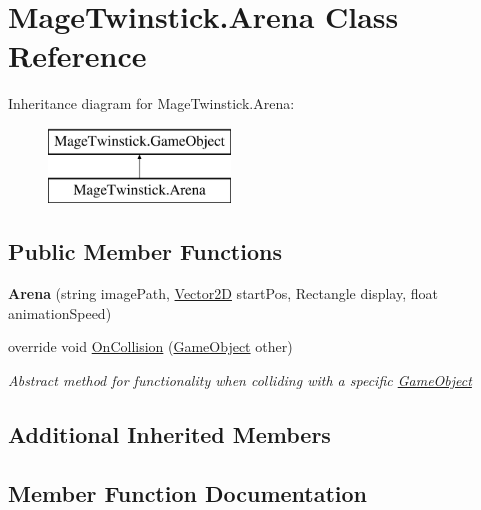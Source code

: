 \hypertarget{class_mage_twinstick_1_1_arena}{}\section{Mage\+Twinstick.\+Arena Class Reference}
\label{class_mage_twinstick_1_1_arena}
Inheritance diagram for Mage\+Twinstick.\+Arena\+:\begin{figure}[H]
\begin{center}
\leavevmode
\includegraphics[height=2.000000cm]{class_mage_twinstick_1_1_arena}
\end{center}
\end{figure}
\subsection*{Public Member Functions}
\begin{DoxyCompactItemize}
\item 
\hypertarget{class_mage_twinstick_1_1_arena_aace14406dc02031e9739a08e5be7301b}{}{\bfseries Arena} (string image\+Path, \hyperlink{class_mage_twinstick_1_1_vector2_d}{Vector2\+D} start\+Pos, Rectangle display, float animation\+Speed)\label{class_mage_twinstick_1_1_arena_aace14406dc02031e9739a08e5be7301b}

\item 
override void \hyperlink{class_mage_twinstick_1_1_arena_a12cdc5acc58ee006eb0b5a47507934fc}{On\+Collision} (\hyperlink{class_mage_twinstick_1_1_game_object}{Game\+Object} other)
\begin{DoxyCompactList}\small\item\em Abstract method for functionality when colliding with a specific \hyperlink{class_mage_twinstick_1_1_game_object}{Game\+Object} \end{DoxyCompactList}\end{DoxyCompactItemize}
\subsection*{Additional Inherited Members}


\subsection{Member Function Documentation}
\hypertarget{class_mage_twinstick_1_1_arena_a12cdc5acc58ee006eb0b5a47507934fc}{}
